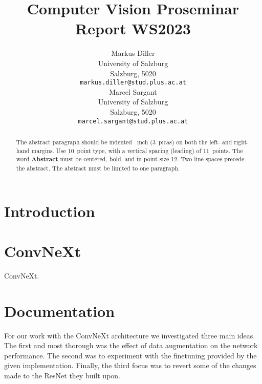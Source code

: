 \documentclass{article}
\title{Computer Vision Proseminar Report WS2023}
\author{%
    Markus Diller\\
    University of Salzburg\\
    Salzburg, 5020 \\
    \texttt{markus.diller@stud.plus.ac.at} \\
    \And
    Marcel Sargant \\
    University of Salzburg \\
    Salzburg, 5020 \\
    \texttt{marcel.sargant@stud.plus.ac.at} \\
}
\begin{document}
    \maketitle


    \begin{abstract}
        The abstract paragraph should be indented ~inch (3~picas) on both the left- and right-hand margins.
        Use 10~point type, with a vertical spacing (leading) of 11~points.
        The word \textbf{Abstract} must be centered, bold, and in point size 12.
        Two line spaces precede the abstract.
        The abstract must be limited to one paragraph.
    \end{abstract}


    \section{Introduction}\label{sec:introduction}


    \section{ConvNeXt}\label{sec:convnext}
    ConvNeXt\cite{liu2022convnet}.


    \section{Documentation}\label{sec:documentation}
    For our work with the ConvNeXt architecture we investigated three main ideas.
    The first and most thorough was the effect of data augmentation on the network performance.
    The second was to experiment with the finetuning provided by the given implementation.
    Finally, the third focus was to revert some of the changes~ made to the ResNet they built upon.
\end{document}
